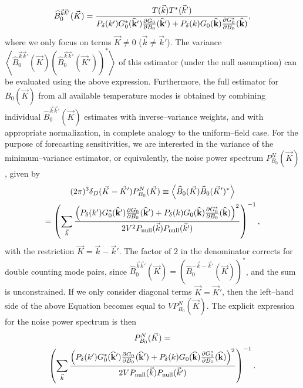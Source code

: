 \documentclass[aps,prd,twocolumn,floatfix,showpacs,superscriptaddress,nofootinbib]{revtex4-1}
\newcommand{\beq}{\begin{equation}}
\newcommand{\eeq}{\end{equation}}
\newcommand{\bga}{\begin{gathered}}
\newcommand{\ega}{\end{gathered}}
\begin{document}
\beq
\widehat B_0^{\vec k\vec k'}(\vec K) = \frac{T(\vec k)T^*(\vec k')}{P_\delta(k')G_0^*({\bf{\widehat k'}})\frac{\partial G_0}{\partial B_0}({\bf{\widehat k'}}) + P_\delta(k)G_0({\bf{\widehat k}})\frac{\partial G_0^*}{\partial B_0}({\bf{\widehat k}})},
\label{eq:Bkkp_estimator}
\eeq
where we only focus on terms $\vec K\ne0$ ($\vec k \ne\vec k'$).
The variance $\left< \widehat B_0^{\vec k\vec k'}(\vec K)\left(\widehat B_0^{\vec k\vec k'}(\vec K')\right)^*\right>$ of this estimator (under the null assumption) can be evaluated using the above expression. Furthermore, the full estimator for $B_0(\vec K)$ from all available temperature modes is obtained by combining individual $\widehat B_0^{\vec k\vec k'}(\vec K)$ estimates with inverse--variance weights, and with appropriate normalization, in complete analogy to the uniform--field case. For the purpose of forecasting sensitivities, we are interested in the variance of the minimum--variance estimator, or equivalently, the noise power spectrum $P^N_{B_0}(\vec K)$, given by
\beq
\bga
(2\pi)^3\delta_D(\vec K - \vec K') P^N_{B_0}(\vec K) \equiv \left< \widehat B_0(\vec K)\widehat B_0(\vec K')^*\right>\\
= \left( \sum_{\vec k} \frac{\left(P_\delta(k')G_0^*({\bf{\widehat k'}})\frac{\partial G_0}{\partial B_0}({\bf{\widehat k'}}) + P_\delta(k)G_0({\bf{\widehat k}})\frac{\partial G_0^*}{\partial B_0}({\bf{\widehat k}})\right)^2}{2V^2P_\text{null}(\vec k) P_\text{null}(\vec k')} \right)^{-1},
\ega
\label{eq:NK1}
\eeq
with the restriction $\vec K=\vec k-\vec k'$. The factor of $2$ in the denominator corrects for double counting mode pairs, since $\widehat B_0^{\vec k\vec k'}(\vec K)=\left(\widehat B_0^{-\vec k-\vec k'}(\vec K)\right)^*$, and the sum is unconstrained. If we only consider diagonal terms $\vec K=\vec K'$, then the left--hand side of the above Equation becomes equal to $V P^N_{B_0}(\vec K)$. The explicit expression for the noise power spectrum is then
\beq
\bga
P^N_{B_0}(\vec K) = \\
\left(\sum_{\vec k} \frac{\left(P_\delta(k')G_0^*({\bf{\widehat k'}})\frac{\partial G_0}{\partial B_0}({\bf{\widehat k'}}) + P_\delta(k)G_0({\bf{\widehat k}})\frac{\partial G_0^*}{\partial B_0}({\bf{\widehat k}})\right)^2}{2VP_\text{null}(\vec k) P_\text{null}(\vec k')  } \right)^{-1}.
\label{eq:NK}
\ega
\eeq
\end{document}
